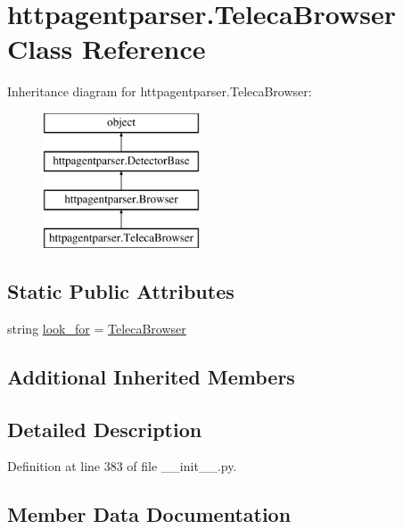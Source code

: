 \hypertarget{classhttpagentparser_1_1_teleca_browser}{}\section{httpagentparser.\+Teleca\+Browser Class Reference}
\label{classhttpagentparser_1_1_teleca_browser}
Inheritance diagram for httpagentparser.\+Teleca\+Browser\+:\begin{figure}[H]
\begin{center}
\leavevmode
\includegraphics[height=4.000000cm]{classhttpagentparser_1_1_teleca_browser}
\end{center}
\end{figure}
\subsection*{Static Public Attributes}
\begin{DoxyCompactItemize}
\item 
string \hyperlink{classhttpagentparser_1_1_teleca_browser_ab1755f5219147e231d21a402eadcba6a}{look\+\_\+for} = \textquotesingle{}\hyperlink{classhttpagentparser_1_1_teleca_browser}{Teleca\+Browser}\textquotesingle{}
\end{DoxyCompactItemize}
\subsection*{Additional Inherited Members}


\subsection{Detailed Description}


Definition at line 383 of file \+\_\+\+\_\+init\+\_\+\+\_\+.\+py.



\subsection{Member Data Documentation}
\hypertarget{classhttpagentparser_1_1_teleca_browser_ab1755f5219147e231d21a402eadcba6a}{}\label{classhttpagentparser_1_1_teleca_browser_ab1755f5219147e231d21a402eadcba6a} 
